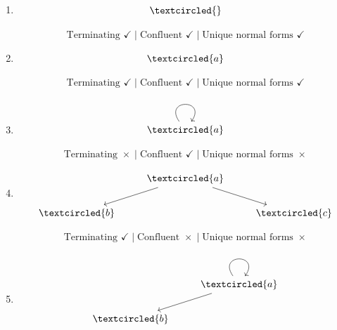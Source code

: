 \documentclass{article}
\theoremstyle{theorem}
\theoremstyle{definition}
\theoremstyle{remark}
\begin{document}
\begin{enumerate}
    \item %
\[\begin{tikzcd}
	\textcircled{ }
\end{tikzcd}\]

\[
\text{Terminating } \checkmark
\;\big|\;
\text{Confluent } \checkmark
\;\big|\;
\text{Unique normal forms } \checkmark
\]

    \item %
\[\begin{tikzcd}
	{\textcircled{a}}
\end{tikzcd}\]

\[
\text{Terminating } \checkmark
\;\big|\;
\text{Confluent } \checkmark
\;\big|\;
\text{Unique normal forms } \checkmark
\]

    \item %
\[\begin{tikzcd}
	{\textcircled{a}}
	\arrow[from=1-1, to=1-1, loop, in=55, out=125, distance=10mm]
\end{tikzcd}\]

\[
\text{Terminating } \times
\;\big|\;
\text{Confluent } \checkmark
\;\big|\;
\text{Unique normal forms } \times
\]

    \item %
\[\begin{tikzcd}
	& {\textcircled{a}} \\
	{\textcircled{b}} && {\textcircled{c}}
	\arrow[from=1-2, to=2-1]
	\arrow[from=1-2, to=2-3]
\end{tikzcd}\]

\[
\text{Terminating } \checkmark
\;\big|\;
\text{Confluent } \times
\;\big|\;
\text{Unique normal forms } \times
\]


    \item %
\[\begin{tikzcd}
	& {\textcircled{a}} \\
	{\textcircled{b}}
	\arrow[from=1-2, to=1-2, loop, in=55, out=125, distance=10mm]
	\arrow[from=1-2, to=2-1]
\end{tikzcd}\]


\end{enumerate}
\end{document}
